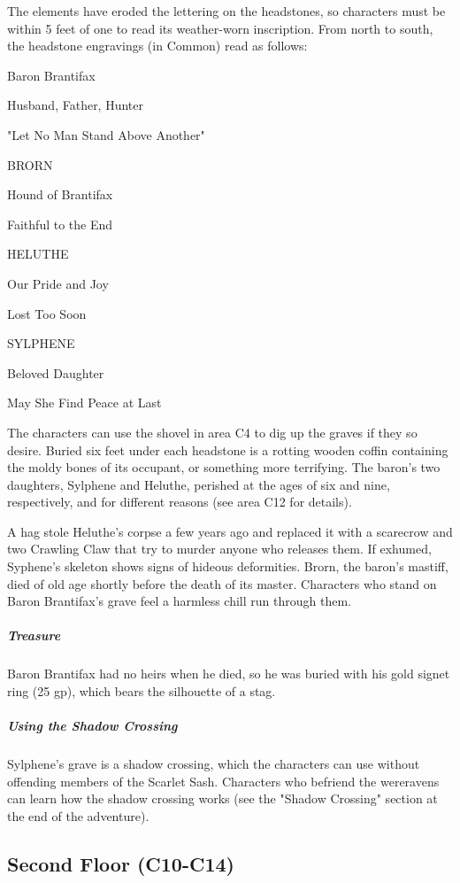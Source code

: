 \documentclass[10pt,a4paper,twoside,bg=print,twocolumn,openany,nodeprecatedcode]{dndbook}
\begin{document}
The elements have eroded the lettering on the headstones, so characters must be within 5 feet of one to read its weather-worn inscription. From north to south, the headstone engravings (in Common) read as follows:

\begin{DndReadAloud}{}
Baron Brantifax

Husband, Father, Hunter

"Let No Man Stand Above Another"

BRORN

Hound of Brantifax

Faithful to the End

HELUTHE

Our Pride and Joy

Lost Too Soon

SYLPHENE

Beloved Daughter

May She Find Peace at Last

\end{DndReadAloud}

The characters can use the shovel in area C4 to dig up the graves if they so desire. Buried six feet under each headstone is a rotting wooden coffin containing the moldy bones of its occupant, or something more terrifying. The baron's two daughters, Sylphene and Heluthe, perished at the ages of six and nine, respectively, and for different reasons (see area C12 for details).

A hag stole Heluthe's corpse a few years ago and replaced it with a scarecrow and two Crawling Claw that try to murder anyone who releases them. If exhumed, Syphene's skeleton shows signs of hideous deformities. Brorn, the baron's mastiff, died of old age shortly before the death of its master. Characters who stand on Baron Brantifax's grave feel a harmless chill run through them.

\subparagraph{Treasure}
Baron Brantifax had no heirs when he died, so he was buried with his gold signet ring (25 gp), which bears the silhouette of a stag.

\subparagraph{Using the Shadow Crossing}
Sylphene's grave is a shadow crossing, which the characters can use without offending members of the Scarlet Sash. Characters who befriend the wereravens can learn how the shadow crossing works (see the "Shadow Crossing" section at the end of the adventure).

\subsection{Second Floor (C10-C14)}
\end{document}
